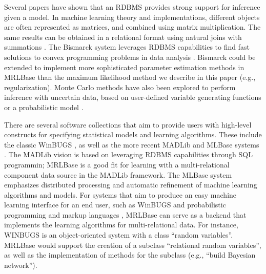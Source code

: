 \documentclass{acm_proc_article-sp}
\begin{document}
Several papers have shown that an RDBMS provides strong support for inference given a model. 
In machine learning theory and implementations, different objects are often represented as matrices, and combined using matrix multiplication. The same results can be obtained in a relational format using natural joins with summations \cite{Wong1995}. The Bismarck system leverages RDBMS capabilities to find fast solutions to convex programming problems in data analysis \cite{Feng_SIGMOD_2012}. Bismarck could be extended to implement more sophisticated parameter estimation methods in MRLBase than the maximum likelihood method we describe in this paper (e.g., regularization). 
Monte Carlo methods have also been explored to perform inference with uncertain data, based on user-defined variable generating functions \cite{MCDB_SIGMOD_2008} or a probabilistic model \cite{Wick_VLDB_2010}.  

There are several software collections that aim to provide users with high-level constructs for specifying statistical models and learning algorithms. These include the classic WinBUGS \cite{Lunn2000}, as well as the more recent MADLib \cite{MADlib_VLDB_2012} and MLBase systems \cite{MLbase_ICDR_2013}. The MADLib vision is based on leveraging RDBMS capabilities through SQL programmin; MRLBase is a good fit for learning with a multi-relational component data source in the MADLib framework. 
The MLBase system emphasizes distributed processing and automatic refinement of machine learning algorithms and models. For systems that aim to produce an easy machine learning interface for an end user, such as WinBUGS and probabilistic programming and markup languages \cite{Guazzelli2009,Milch2005}, MRLBase can serve as a backend that implements the learning algorithms for multi-relational data. For instance, WINBUGS is an object-oriented system with a class ``random variables''. MRLBase would support the creation of a subclass ``relational random variables'', as well as the implementation of methods for the subclass (e.g., ``build Bayesian network'').
\end{document}
